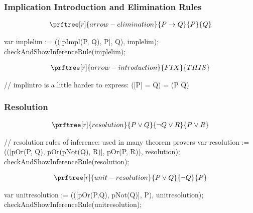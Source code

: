 \documentclass[letterpaper,10pt,english]{sphinxmanual}
\begin{document}
\subsubsection{Implication Introduction and Elimination Rules}
\label{\detokenize{13-consequence:implication-introduction-and-elimination-rules}}\begin{equation*}
\begin{split}\prftree[r]{arrow-elimination}{P \rightarrow Q}{P}{Q}\end{split}
\end{equation*}
\begin{sphinxVerbatim}[commandchars=\\\{\}]
var impl\PYGZus{}elim   := (([pImpl(P, Q), P], Q), \PYGZdq{}impl\PYGZus{}elim\PYGZdq{});
checkAndShowInferenceRule(impl\PYGZus{}elim);
\end{sphinxVerbatim}
\begin{equation*}
\begin{split}\prftree[r]{arrow-introduction}{FIX}{THIS}\end{split}
\end{equation*}
\begin{sphinxVerbatim}[commandchars=\\\{\}]
// impl\PYGZus{}intro is a little harder to express: ([P] \textbar{}= Q) \textbar{}= (P \PYGZhy{}\PYGZgt{} Q)
\end{sphinxVerbatim}


\subsubsection{Resolution}
\label{\detokenize{13-consequence:resolution}}\begin{equation*}
\begin{split}\prftree[r]{resolution}{P \lor Q}{{\neg Q} \lor R}{P \lor R}\end{split}
\end{equation*}
\begin{sphinxVerbatim}[commandchars=\\\{\}]
// resolution rules of inference: used in many theorem provers
var resolution   := (([pOr(P, Q), pOr(pNot(Q), R)], pOr(P, R)), \PYGZdq{}resolution\PYGZdq{});
checkAndShowInferenceRule(resolution);
\end{sphinxVerbatim}
\begin{equation*}
\begin{split}\prftree[r]{unit-resolution}{P \lor Q}{\neg Q}{P}\end{split}
\end{equation*}
\begin{sphinxVerbatim}[commandchars=\\\{\}]
var unit\PYGZus{}resolution  := (([pOr(P,Q), pNot(Q)], P), \PYGZdq{}unit\PYGZus{}resolution\PYGZdq{});
checkAndShowInferenceRule(unit\PYGZus{}resolution);
\end{sphinxVerbatim}
\end{document}

